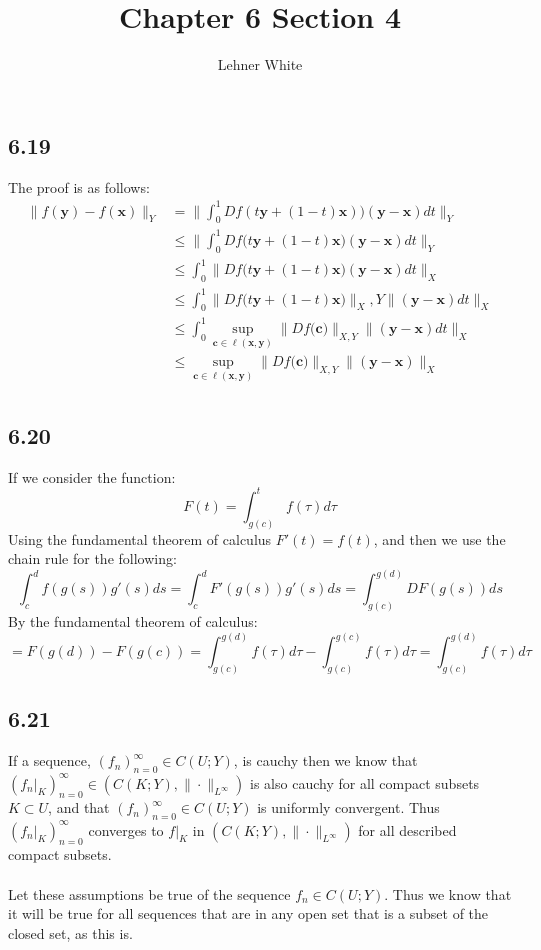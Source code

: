 \documentclass[letterpaper,12pt]{article}
\theoremstyle{definition}
\begin{document}
\title{Chapter 6 Section 4}
\author{Lehner White}
\maketitle

\subsection*{6.19}
The proof is as follows:
\begin{align*}
    \|f(\textbf{y} ) - f(\textbf{x} )\|_Y &= \|\int^{1}_{0}Df(t \textbf{y}  + (1-t)\textbf{x} ))(\textbf{y} -\textbf{x} ) dt\|_Y\\
    &\leq \| \int_0^1 Df\big(t \textbf{y} + (1- t) \textbf{x} \big) ( \textbf{y} - \textbf{x}) dt\|_Y \\
    &\leq \int_0^1 \|  Df\big(t \textbf{y} + (1- t) \textbf{x} \big) ( \textbf{y} - \textbf{x}) dt\|_X \\
    &\leq \int_0^1 \|  Df\big(t \textbf{y} + (1- t) \textbf{x} \big) \|_X,Y \| ( \textbf{y} - \textbf{x})dt \|_X \\
    &\leq \int_0^1 \sup_{ \textbf{c} \in \ell( \textbf{x}, \textbf{y})} \|  Df\big( \textbf{c} \big) \|_{X,Y} \| ( \textbf{y} - \textbf{x}) dt\|_X \\
    &\leq \sup_{ \textbf{c} \in \ell( \textbf{x}, \textbf{y})} \|  Df\big( \textbf{c} \big) \|_{X,Y} \| ( \textbf{y} - \textbf{x}) \|_X \\
\end{align*}

\subsection*{6.20}
If we consider the function:
\[F(t) =  \int_{g(c)}^{t} f(\tau) d\tau\] 
Using the fundamental theorem of calculus $F'(t) = f(t)$, and then we use the chain rule for the following:
\[\int_c^d f(g(s))g'(s)ds = \int_c^d F'(g(s))g'(s)ds= \int_{g(c)}^{g(d)} DF(g(s))ds\]
By the fundamental theorem of calculus:
\[= F(g(d)) - F(g(c)) = \int_{g(c)}^{g(d)} f(\tau)d\tau - \int_{g(c)}^{g(c)} f(\tau)d\tau = \int_{g(c)}^{g(d)} f(\tau)d \tau\]

\subsection*{6.21}
If a sequence, $(f_n)_{n=0}^\infty \in C(U;Y)$, is cauchy then we know that $(f_n|_K)_{n=0}^\infty \in (C(K;Y), \|\cdot \|_{L^\infty})$ is also cauchy for all compact subsets $K \subset U$, and that $(f_n)_{n=0}^\infty \in C(U;Y)$ is uniformly convergent. Thus $(f_n|_K)_{n=0}^\infty$ converges to $f|_K \text{ in }(C(K;Y), \|\cdot \|_{L^\infty})$ for all described compact subsets. \\
\\
Let these assumptions be true of the sequence  $f_n \in C(U;Y)$. Thus we know that it will be true for all sequences that are in any open set that is a subset of the closed set, as this is. 
\end{document}
